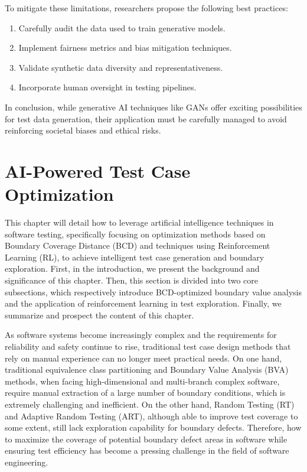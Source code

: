\documentclass[manuscript,screen,review]{acmart}
\begin{document}
To mitigate these limitations, researchers propose the following best practices:

\begin{enumerate}
  \item Carefully audit the data used to train generative models.
  \item Implement fairness metrics and bias mitigation techniques.
  \item Validate synthetic data diversity and representativeness.
  \item Incorporate human oversight in testing pipelines.
\end{enumerate}

In conclusion, while generative AI techniques like GANs offer exciting possibilities for test data generation, their application must be carefully managed to avoid reinforcing societal biases and ethical risks.




\section{AI-Powered Test Case Optimization}
\label{sec:3}

This chapter will detail how to leverage artificial intelligence techniques in software testing, specifically focusing on optimization methods based on Boundary Coverage Distance (BCD) and techniques using Reinforcement Learning (RL), to achieve intelligent test case generation and boundary exploration. First, in the introduction, we present the background and significance of this chapter. Then, this section is divided into two core subsections, which respectively introduce BCD-optimized boundary value analysis and the application of reinforcement learning in test exploration. Finally, we summarize and prospect the content of this chapter.

As software systems become increasingly complex and the requirements for reliability and safety continue to rise, traditional test case design methods that rely on manual experience can no longer meet practical needs. On one hand, traditional equivalence class partitioning and Boundary Value Analysis (BVA) methods, when facing high-dimensional and multi-branch complex software, require manual extraction of a large number of boundary conditions, which is extremely challenging and inefficient. On the other hand, Random Testing (RT) and Adaptive Random Testing (ART), although able to improve test coverage to some extent, still lack exploration capability for boundary defects. Therefore, how to maximize the coverage of potential boundary defect areas in software while ensuring test efficiency has become a pressing challenge in the field of software engineering.
\end{document}
